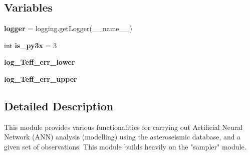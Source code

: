 \subsection*{Variables}
\begin{DoxyCompactItemize}
\item 
\mbox{\label{namespaceasamba_1_1artificial__neural__network_a66dff561d7490b43b8326fb3d440865d}} 
{\bfseries logger} = logging.\+get\+Logger(\+\_\+\+\_\+name\+\_\+\+\_\+)
\item 
\mbox{\label{namespaceasamba_1_1artificial__neural__network_a4b22bd8e2d4276f9d10878b5362ea2b9}} 
int {\bfseries is\+\_\+py3x} = 3
\item 
\mbox{\label{namespaceasamba_1_1artificial__neural__network_a0e9ae850e46e27f564f8111bfde12961}} 
{\bfseries log\+\_\+\+Teff\+\_\+err\+\_\+lower}
\item 
\mbox{\label{namespaceasamba_1_1artificial__neural__network_a1bb4e6a734b5d9e14ac5cfac857d5c49}} 
{\bfseries log\+\_\+\+Teff\+\_\+err\+\_\+upper}
\end{DoxyCompactItemize}


\subsection{Detailed Description}
\begin{DoxyVerb}This module provides various functionalities for carrying out Artificial Neural Network (ANN)
analysis (modelling) using the asteroseismic database, and a given set of observations. This
module builds heavily on the "sampler" module.
\end{DoxyVerb}
 